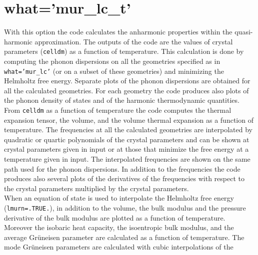 \documentclass[12pt,a4paper,twoside]{report}
\begin{document}

\newpage
{\color{coral}\section{what='mur\_lc\_t'}}
\color{black}
With this option the code calculates the anharmonic 
properties within the quasi-harmonic approximation. 
The outputs of the code are the values of crystal parameters 
(\texttt{celldm}) as a function of temperature. This calculation is done 
by computing the phonon dispersions on all the geometries specified as in
\texttt{what='mur\_lc'} (or on a subset of these geometries) and 
minimizing the Helmholtz free energy.
Separate plots of the phonon dispersions are obtained for all the 
calculated geometries.
For each geometry the code produces also plots of the phonon density
of states and of the harmonic thermodynamic quantities.
From \texttt{celldm} as a function of temperature the code computes the thermal
expansion tensor, the volume, and the volume thermal expansion as a 
function of temperature. 
The frequencies at all the calculated geometries are interpolated
by quadratic or quartic polynomials of the crystal parameters
and can be shown at crystal parameters given in input or at those that
minimize the free energy at a temperature given in input. The 
interpolated frequencies  
are shown on the same path used for the phonon dispersions.
In addition to the frequencies the code produces also several plots of
the derivatives of the frequencies with respect to the crystal parameters
multiplied by the crystal parameters. \\
When an equation of state is used to interpolate the
Helmholtz free energy (\texttt{lmurn=.TRUE.}), in addition to the volume, 
the bulk modulus and the pressure derivative of the bulk modulus are 
plotted as a function of 
temperature. Moreover the isobaric heat capacity, the isoentropic 
bulk modulus, and the average Gr\"uneisen parameter are calculated as 
a function of temperature.
The mode Gr\"uneisen parameters are calculated with cubic interpolations of the
\end{document}
